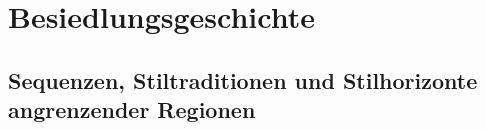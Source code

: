 \chapter{Besiedlungsgeschichte}\label{sec:BesiedlGesch}

\begin{multicols}{2}
\raggedcolumns






\section{Sequenzen, Stiltraditionen und Stilhorizonte angrenzender Regionen}\label{sec:Nachbarregionen}















\end{multicols}